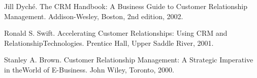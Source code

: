 \begin{course}
\begin{literature}
  

Jill Dyché. The CRM Handbook: A Business Guide to Customer Relationship Management. Addison-Wesley, Boston, 2nd edition, 2002.

  

Ronald S. Swift. Accelerating Customer Relationships: Using CRM and RelationshipTechnologies. Prentice Hall, Upper Saddle River, 2001.

   

Stanley A. Brown. Customer Relationship Management: A Strategic Imperative in theWorld of E-Business. John Wiley, Toronto, 2000.

           \end{literature}



\end{course}